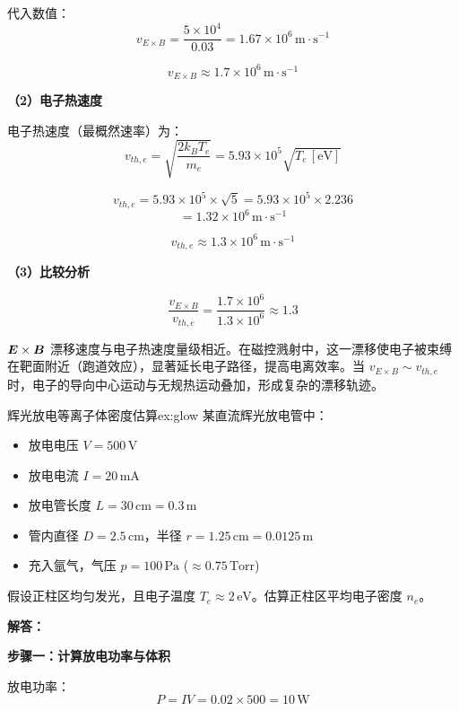 代入数值：
\[
    v_{E\times B} = \frac{5\times10^4}{0.03} = 1.67\times10^6\,\mathrm{m\cdot s^{-1}}
\]

\[
    \boxed{v_{E\times B} \approx 1.7\times10^6\,\mathrm{m\cdot s^{-1}}}
\]

\textbf{（2）电子热速度}

电子热速度（最概然速率）为：
\begin{equation}
    v_{th,e} = \sqrt{\frac{2 k_B T_e}{m_e}} = 5.93\times10^5 \sqrt{T_e\,[\mathrm{eV}]}
\label{eq:ch11-thermal-velocity}
\end{equation}

\[
    v_{th,e} = 5.93\times10^5 \times \sqrt{5} = 5.93\times10^5 \times 2.236
\]
\[
    = 1.32\times10^6\,\mathrm{m\cdot s^{-1}}
\]

\[
    \boxed{v_{th,e} \approx 1.3\times10^6\,\mathrm{m\cdot s^{-1}}}
\]

\textbf{（3）比较分析}

\[
    \frac{v_{E\times B}}{v_{th,e}} = \frac{1.7\times10^6}{1.3\times10^6} \approx 1.3
\]

$\bm{E}\times\bm{B}$ 漂移速度与电子热速度量级相近。在磁控溅射中，这一漂移使电子被束缚在靶面附近（跑道效应），显著延长电子路径，提高电离效率。当 $v_{E\times B} \sim v_{th,e}$ 时，电子的导向中心运动与无规热运动叠加，形成复杂的漂移轨迹。


\begin{example}{辉光放电等离子体密度估算}{ex:glow}
某直流辉光放电管中：
\begin{itemize}
    \item 放电电压 $V = 500\,\mathrm{V}$
    \item 放电电流 $I = 20\,\mathrm{mA}$
    \item 放电管长度 $L = 30\,\mathrm{cm} = 0.3\,\mathrm{m}$
    \item 管内直径 $D = 2.5\,\mathrm{cm}$，半径 $r = 1.25\,\mathrm{cm} = 0.0125\,\mathrm{m}$
    \item 充入氩气，气压 $p = 100\,\mathrm{Pa}$ ($\approx 0.75\,\mathrm{Torr}$)
\end{itemize}
假设正柱区均匀发光，且电子温度 $T_e \approx 2\,\mathrm{eV}$。估算正柱区平均电子密度 $n_e$。
\end{example}

\textbf{解答：}

\textbf{步骤一：计算放电功率与体积}

放电功率：
\[
    P = I V = 0.02 \times 500 = 10\,\mathrm{W}
\]


